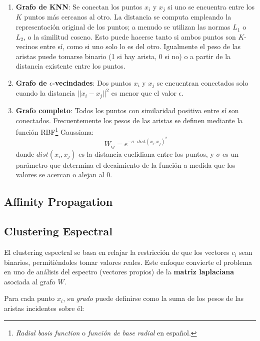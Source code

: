 \begin{enumerate}
    \item \textbf{Grafo de KNN}: Se conectan los puntos $x_i$ y $x_j$ si uno se encuentra entre los $K$ puntos más cercanos al otro.
    La distancia se computa empleando la representación original de los puntos;
    a menudo se utilizan las normas $L_1$ o $L_2$, o la similitud coseno.
    Esto puede hacerse tanto si ambos puntos son $K$-vecinos entre sí, como si uno solo lo es del otro.
    Igualmente el peso de las aristas puede tomarse binario (1 si hay arista, 0 si no) o a partir de la distancia existente entre los puntos.

    \item \textbf{Grafo de $\epsilon$-vecindades}: Dos puntos $x_i$ y $x_j$ se encuentran conectados solo cuando la distancia $|| x_i - x_j ||^2$ es menor que el valor $\epsilon$.

    \item \textbf{Grafo completo}: Todos los puntos con similaridad positiva entre sí son conectados.
    Frecuentemente los pesos de las aristas se definen mediante la función RBF\footnote{\textit{Radial basis function} o \textit{función de base radial} en español.} Gaussiana:
    \[
        W_{ij} = e^{-\sigma \cdot dist(x_i , x_j)^2}
    \]
    donde $dist(x_i , x_j)$ es la distancia euclidiana entre los puntos, y $\sigma$ es un parámetro que determina el decaimiento de la función a medida que los valores se acercan o alejan al 0.
\end{enumerate}

\subsection{Affinity Propagation}\label{subsec:affinityPropagation}



\subsection{Clustering Espectral}\label{subsec:clusteringEspectral}

El clustering espectral se basa en relajar la restricción de que los vectores $c_i$ sean binarios, permitiéndoles tomar valores reales.
Este enfoque convierte el problema en uno de análisis del espectro (vectores propios) de la \textbf{matriz laplaciana} asociada al grafo $W$.

Para cada punto $x_i$, su \textit{grado} puede definirse como la suma de los pesos de las aristas incidentes sobre él:

